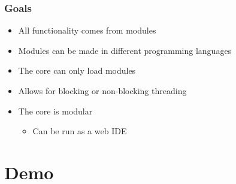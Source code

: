 \begin{frame}
  \frametitle{Goals}
  \begin{itemize}
    \item All functionality comes from modules
    \item Modules can be made in different programming languages
    \item The core can only load modules
    \item Allows for blocking or non-blocking threading
    \item The core is modular
    \begin{itemize}
      \item Can be run as a web IDE
    \end{itemize}
  \end{itemize}
\end{frame}

\section{Demo}
\SectionPage